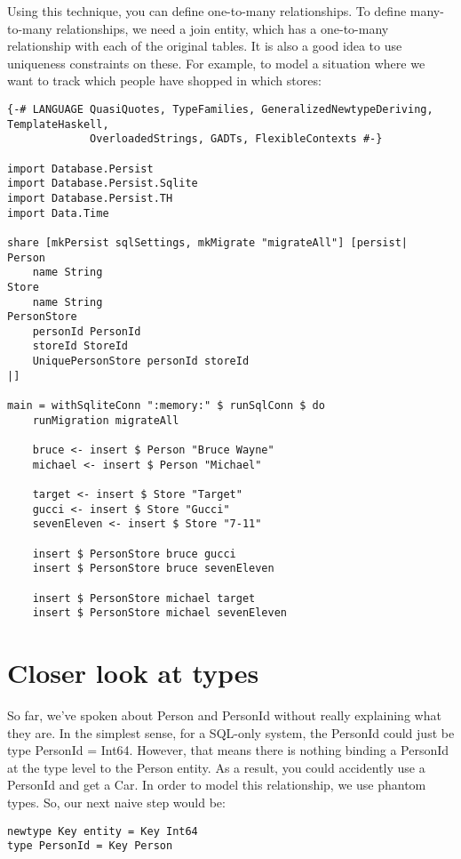 Using this technique, you can define one-to-many relationships. To define many-to-many relationships, we need a join entity, which has a one-to-many relationship with each of the original tables. It is also a good idea to use uniqueness constraints on these. For example, to model a situation where we want to track which people have shopped in which stores:

\begin{lstlisting}
{-# LANGUAGE QuasiQuotes, TypeFamilies, GeneralizedNewtypeDeriving, TemplateHaskell,
             OverloadedStrings, GADTs, FlexibleContexts #-}

import Database.Persist
import Database.Persist.Sqlite
import Database.Persist.TH
import Data.Time

share [mkPersist sqlSettings, mkMigrate "migrateAll"] [persist|
Person
    name String
Store
    name String
PersonStore
    personId PersonId
    storeId StoreId
    UniquePersonStore personId storeId
|]

main = withSqliteConn ":memory:" $ runSqlConn $ do
    runMigration migrateAll

    bruce <- insert $ Person "Bruce Wayne"
    michael <- insert $ Person "Michael"

    target <- insert $ Store "Target"
    gucci <- insert $ Store "Gucci"
    sevenEleven <- insert $ Store "7-11"

    insert $ PersonStore bruce gucci
    insert $ PersonStore bruce sevenEleven

    insert $ PersonStore michael target
    insert $ PersonStore michael sevenEleven
\end{lstlisting}%

\section{Closer look at types}

So far, we've spoken about Person and PersonId without really explaining what they are. In the simplest sense, for a SQL-only system, the PersonId could just be type PersonId = Int64. However, that means there is nothing binding a PersonId at the type level to the Person entity. As a result, you could accidently use a PersonId and get a Car. In order to model this relationship, we use phantom types. So, our next naive step would be:

\begin{lstlisting}
newtype Key entity = Key Int64
type PersonId = Key Person
\end{lstlisting}

